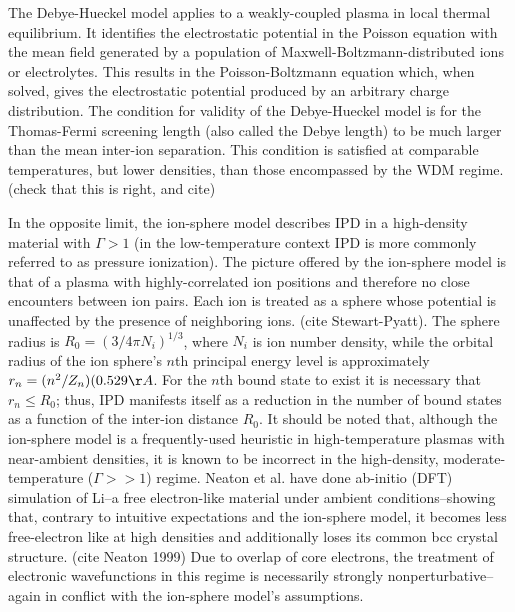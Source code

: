 The Debye-Hueckel model applies to a weakly-coupled plasma in local thermal equilibrium. It identifies the electrostatic potential in the Poisson equation with the mean field generated by a population of Maxwell-Boltzmann-distributed ions or electrolytes. This results in the Poisson-Boltzmann equation which, when solved, gives the electrostatic potential produced by an arbitrary charge distribution. The condition for validity of the Debye-Hueckel model is for the Thomas-Fermi screening length (also called the Debye length) to be much larger than the mean inter-ion separation. This condition is satisfied at comparable temperatures, but lower densities, than those encompassed by the WDM regime. (check that this is right, and cite)

In the opposite limit, the ion-sphere model describes IPD in a high-density material with $\Gamma > 1$ (in the low-temperature context IPD is more commonly referred to as pressure ionization). The picture offered by the ion-sphere model is that of a plasma with highly-correlated ion positions and therefore no close encounters between ion pairs. Each ion is treated as a sphere whose potential is unaffected by the presence of neighboring ions. (cite Stewart-Pyatt). The sphere radius is $R_0 = (3/4 \pi N_i)^{1/3}$, where $N_i$ is ion number density, while the orbital radius of the ion sphere's $n$th principal energy level is approximately $r_n = (n^2/Z_n)(0.529 \AA$. For the $n$th bound state to exist it is necessary that $r_n \leq R_0$; thus, IPD manifests itself as a reduction in the number of bound states as a function of the inter-ion distance $R_0$. It should be noted that, although the ion-sphere model is a frequently-used heuristic in high-temperature plasmas with near-ambient densities, it is known to be incorrect in the high-density, moderate-temperature ($\Gamma >> 1$) regime. Neaton et al. have done ab-initio (DFT) simulation of Li--a free electron-like material under ambient conditions--showing that, contrary to intuitive expectations and the ion-sphere model, it becomes less free-electron like at high densities and additionally loses its common bcc crystal structure. (cite Neaton 1999) Due to overlap of core electrons, the treatment of electronic wavefunctions in this regime is necessarily strongly nonperturbative--again in conflict with the ion-sphere model's assumptions. 



